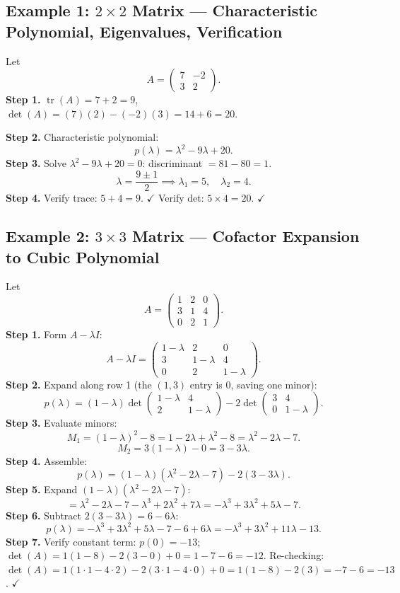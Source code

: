 \documentclass[12pt,a4paper]{article}
\begin{document}
\subsection*{Example 1: $2\times 2$ Matrix --- Characteristic Polynomial, Eigenvalues, Verification}

Let
\[
  A = \begin{pmatrix} 7 & -2 \\ 3 & 2 \end{pmatrix}.
\]
\textbf{Step 1.} $\operatorname{tr}(A) = 7+2 = 9$, $\det(A) = (7)(2)-(-2)(3) = 14+6 = 20$.

\textbf{Step 2.} Characteristic polynomial:
\[
  p(\lambda) = \lambda^2 - 9\lambda + 20.
\]
\textbf{Step 3.} Solve $\lambda^2 - 9\lambda + 20 = 0$: discriminant $= 81 - 80 = 1$.
\[
  \lambda = \frac{9 \pm 1}{2} \implies \lambda_1 = 5,\quad \lambda_2 = 4.
\]
\textbf{Step 4.} Verify trace: $5+4=9$. $\checkmark$ \quad Verify det: $5\times4=20$. $\checkmark$

\subsection*{Example 2: $3\times 3$ Matrix --- Cofactor Expansion to Cubic Polynomial}

Let
\[
  A = \begin{pmatrix} 1 & 2 & 0 \\ 3 & 1 & 4 \\ 0 & 2 & 1 \end{pmatrix}.
\]
\textbf{Step 1.} Form $A - \lambda I$:
\[
  A - \lambda I = \begin{pmatrix} 1-\lambda & 2 & 0 \\ 3 & 1-\lambda & 4 \\ 0 & 2 & 1-\lambda \end{pmatrix}.
\]
\textbf{Step 2.} Expand along row 1 (the $(1,3)$ entry is 0, saving one minor):
\[
  p(\lambda) = (1-\lambda)\det\begin{pmatrix}1-\lambda & 4 \\ 2 & 1-\lambda\end{pmatrix}
             - 2\det\begin{pmatrix}3 & 4 \\ 0 & 1-\lambda\end{pmatrix}.
\]
\textbf{Step 3.} Evaluate minors:
\[
  M_1 = (1-\lambda)^2 - 8 = 1 - 2\lambda + \lambda^2 - 8 = \lambda^2 - 2\lambda - 7.
\]
\[
  M_2 = 3(1-\lambda) - 0 = 3 - 3\lambda.
\]
\textbf{Step 4.} Assemble:
\[
  p(\lambda) = (1-\lambda)(\lambda^2-2\lambda-7) - 2(3-3\lambda).
\]
\textbf{Step 5.} Expand $(1-\lambda)(\lambda^2-2\lambda-7)$:
\[
  = \lambda^2-2\lambda-7 - \lambda^3+2\lambda^2+7\lambda = -\lambda^3+3\lambda^2+5\lambda-7.
\]
\textbf{Step 6.} Subtract $2(3-3\lambda) = 6-6\lambda$:
\[
  p(\lambda) = -\lambda^3+3\lambda^2+5\lambda-7 - 6+6\lambda = -\lambda^3+3\lambda^2+11\lambda-13.
\]
\textbf{Step 7.} Verify constant term: $p(0)=-13$; $\det(A)=1(1-8)-2(3-0)+0=1-7-6=-12$. 
Re-checking: $\det(A)=1(1\cdot1-4\cdot2)-2(3\cdot1-4\cdot0)+0=1(1-8)-2(3)=-7-6=-13$. $\checkmark$
\end{document}
